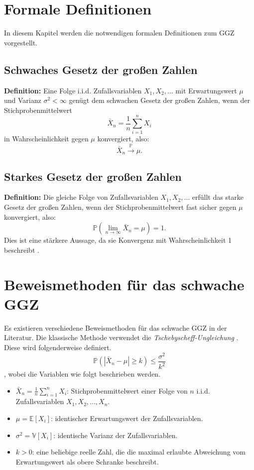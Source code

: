 \documentclass[12pt,a4paper]{article}
\begin{document}
\section{Formale Definitionen}
\label{sec:definitionen}


In diesem Kapitel werden die notwendigen formalen Definitionen zum GGZ vorgestellt.


\subsection{Schwaches Gesetz der großen Zahlen}
\textbf{Definition:}  
Eine Folge i.i.d. Zufallsvariablen \( X_1, X_2, \dots \) mit Erwartungswert \( \mu \) und Varianz \( \sigma^2 < \infty \) genügt dem schwachen Gesetz der großen Zahlen, wenn der Stichprobenmittelwert
\[
\bar{X}_n = \frac{1}{n} \sum_{i=1}^n X_i
\]
in Wahrscheinlichkeit gegen \( \mu \) konvergiert, also:
\[
\bar{X}_n \xrightarrow{\mathbb{P}} \mu.
\]

\subsection{Starkes Gesetz der großen Zahlen}

\textbf{Definition:}  
Die gleiche Folge von Zufallsvariablen \( X_1, X_2, \dots \) erfüllt das starke Gesetz der großen Zahlen, wenn der Stichprobenmittelwert fast sicher gegen \( \mu \) konvergiert, also:
\[
\mathbb{P} \left( \lim_{n \to \infty} \bar{X}_n = \mu \right) = 1.
\]
Dies ist eine stärkere Aussage, da sie Konvergenz mit Wahrscheinlichkeit 1 beschreibt \citep{degroot2021}.


\section{Beweismethoden für das schwache GGZ}
\label{sec:beweismethoden}


Es existieren verschiedene Beweismethoden für das schwache GGZ in der Literatur. Die klassische Methode verwendet die \textit{Tschebyscheff-Ungleichung} \citep{chebyshev1867}. Diese wird folgenderweise definiert.
\[
\mathbb{P} \left( \left| \bar{X}_n - \mu \right| \geq k \right) \leq \frac{\sigma^2}{k^2}
\], wobei die Variablen wie folgt beschrieben werden.
\begin{itemize}
  \item \( \bar{X}_n = \frac{1}{n} \sum_{i=1}^n X_i \): Stichprobenmittelwert einer Folge von \( n \) i.i.d. Zufallsvariablen \( X_1, X_2, \dots, X_n \).
  \item \( \mu = \mathbb{E}[X_i] \): identischer Erwartungswert der Zufallsvariablen.
  \item \( \sigma^2 = \mathbb{V}[X_i] \): identische Varianz der Zufallsvariablen.
    \item \(k > 0 \): eine beliebige reelle Zahl, die die maximal erlaubte Abweichung vom Erwartungswert als obere Schranke beschreibt.
\end{itemize}
\end{document}

